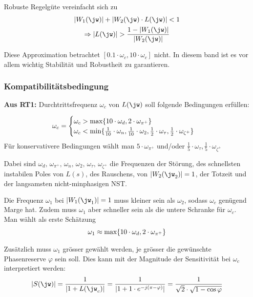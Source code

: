         Robuste Regelgüte vereinfacht sich zu
        \begin{gather*}
            |W_1(\jw)| + |W_2(\jw)\cdot L(\jw)| < 1\\
            \Rightarrow |L(\jw)| > \frac{1 - |W_1(\jw)|}{|W_2(\jw)|}
        \end{gather*}
        
        Diese Approximation betrachtet $[0.1\cdot \omega_c, 10\cdot\omega_c]$ nicht. In diesem band ist es vor allem wichtig Stabilität und Robustheit zu garantieren.
        
    \subsubsection{Kompatibilitätsbedingung}
        \textbf{Aus RT1:} Durchtrittsfrequenz $\omega_c$ von $L(\jw)$ soll folgende Bedingungen erfüllen:
        
        \begin{equation*}
            \omega_c = 
            \begin{cases}
                \omega_c > \textnormal{max}\{10\cdot\omega_d, 2\cdot\omega_{\pi^+}\}\\
                \omega_c < \textnormal{min}\{\frac{1}{10}\cdot\omega_n, \frac{1}{10}\cdot \omega_2, \frac{1}{2}\cdot \omega_\tau, \frac{1}{2}\cdot \omega_{\zeta^+}\}
            \end{cases}
        \end{equation*}
        Für konservativere Bedingungen wählt man $5\cdot\omega_{\pi^+}$ und/oder $\frac{1}{5}\cdot \omega_\tau, \frac{1}{5}\cdot \omega_{\zeta^+}$
        
        Dabei sind $\omega_d,\, \omega_{\pi^+},\, \omega_n,\, \omega_2,\, \omega_\tau,\, \omega_{\zeta^+}$ die Frequenzen der Störung, des schnellsten instabilen Poles von $L(s)$, des Rauschens, von $|W_2(\jw_2)|=1$, der Totzeit und der langsamsten nicht-minphasigen NST.
        
        Die Frequenz $\omega_1$ bei $|W_1(\jw_1)| = 1$ muss kleiner sein als $\omega_2$, sodass $\omega_c$ genügend Marge hat. Zudem muss $\omega_1$ aber schneller sein als die untere Schranke für $\omega_c$. Man wählt als erste Schätzung
        \begin{equation*}
            \omega_1 \approx \textnormal{max}\{10\cdot\omega_d, 2\cdot\omega_{\pi^+}\}
        \end{equation*}
        
        Zusätzlich muss $\omega_1$ grösser gewählt werden, je grösser die gewünschte Phasenreserve $\varphi$ sein soll. Dies kann mit der Magnitude der Sensitivität bei $\omega_c$ interpretiert werden:
        \begin{equation*}
            |S(\jw)| = \frac{1}{|1+L(\jw_c)|}= \frac{1}{|1+1\cdot e^{-j(\pi-\varphi)}|} = \frac{1}{\sqrt{2}\cdot\sqrt{1-\cos{\varphi}}}
        \end{equation*}
        
